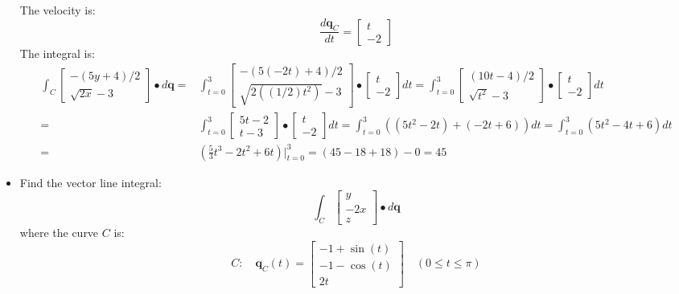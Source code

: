 \documentclass{article}
\begin{document}
\begin{itemize}
The velocity is:
\[\frac{d\mathbf{q}_C}{dt} = \begin{bmatrix} t \\ -2 \end{bmatrix}\]
The integral is:
\begin{align*}
\int_C \begin{bmatrix} -(5y + 4)/2 \\ \sqrt{2x} - 3 \end{bmatrix} \bullet d\mathbf{q} 
= & \int_{t = 0}^3 \begin{bmatrix} -(5(-2t) + 4)/2 \\ \sqrt{2((1/2)t^2)} - 3 \end{bmatrix} \bullet \begin{bmatrix} t \\ -2 \end{bmatrix} dt  
= \int_{t = 0}^3 \begin{bmatrix} (10t - 4)/2 \\ \sqrt{t^2} - 3 \end{bmatrix} \bullet \begin{bmatrix} t \\ -2 \end{bmatrix} dt \\ 
= & \int_{t = 0}^3 \begin{bmatrix} 5t - 2 \\ t - 3 \end{bmatrix} \bullet \begin{bmatrix} t \\ -2 \end{bmatrix} dt  
= \int_{t = 0}^3 ((5t^2 - 2t) + (-2t + 6))dt  
= \int_{t = 0}^3 (5t^2 - 4t + 6)dt \\ 
= & (\frac{5}{3}t^3 - 2t^2 + 6t)\Big|_{t=0}^3 
= (45 - 18 + 18) - 0 = 45
\end{align*}

\item 
Find the vector line integral: 
\[\int_C \begin{bmatrix} y \\ -2x \\ z \end{bmatrix} \bullet d\mathbf{q}\]
where the curve \(C\) is:
\[C : \quad 
\mathbf{q}_C(t) = \begin{bmatrix} 
-1 + \sin(t) \\ -1 - \cos(t) \\ 2t  
\end{bmatrix} \quad 
(0 \leq t \leq \pi)\]


\end{itemize}
\end{document}
